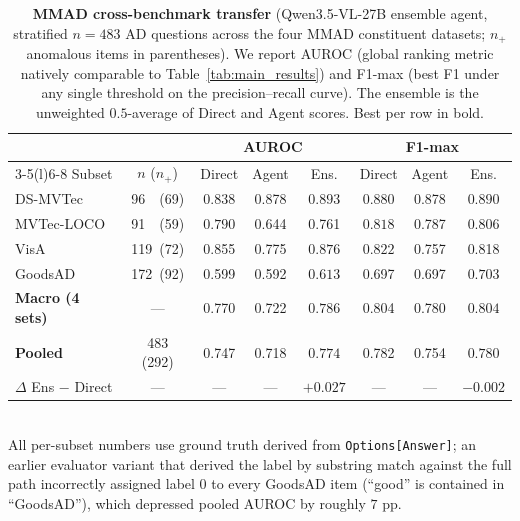 \begin{table}[h]
\centering
\caption{\textbf{MMAD cross-benchmark transfer} (Qwen3.5-VL-27B ensemble agent, stratified $n{=}483$ AD questions across the four MMAD constituent datasets; $n_+$ anomalous items in parentheses). We report AUROC (global ranking metric natively comparable to Table~\ref{tab:main_results}) and F1-max (best F1 under any single threshold on the precision--recall curve). The ensemble is the unweighted $0.5$-average of Direct and Agent scores. Best per row in bold.}
\label{tab:mmad}
\small
\begin{tabular}{lccccccc}
\toprule
 & & \multicolumn{3}{c}{AUROC} & \multicolumn{3}{c}{F1-max} \\
\cmidrule(lr){3-5}\cmidrule(l){6-8}
Subset  & $n$ ($n_+$) & Direct & Agent & Ens. & Direct & Agent & Ens. \\
\midrule
DS-MVTec    & 96\ \ (69) & 0.838 & 0.878 & $\mathbf{0.893}$ & $\mathbf{0.880}$ & 0.878 & $\mathbf{0.890}$ \\
MVTec-LOCO  & 91\ \ (59) & $\mathbf{0.790}$ & 0.644 & 0.761 & $\mathbf{0.818}$ & 0.787 & 0.806 \\
VisA        & 119\ (72) & 0.855 & 0.775 & $\mathbf{0.876}$ & $\mathbf{0.822}$ & 0.757 & 0.818 \\
GoodsAD     & 172\ (92) & 0.599 & 0.592 & $\mathbf{0.613}$ & 0.697 & 0.697 & $\mathbf{0.703}$ \\
\midrule
\textbf{Macro (4 sets)} &  --- & 0.770 & 0.722 & $\mathbf{0.786}$ & 0.804 & 0.780 & $\mathbf{0.804}$ \\
\textbf{Pooled}         & 483 (292) & 0.747 & 0.718 & $\mathbf{0.774}$ & 0.782 & 0.754 & $\mathbf{0.780}$ \\
$\Delta$ Ens $-$ Direct &  --- & --- & --- & $\mathbf{+0.027}$ & --- & --- & $-0.002$ \\
\bottomrule
\end{tabular}
\\[3pt]
{\footnotesize All per-subset numbers use ground truth derived from \texttt{Options[Answer]}; an earlier evaluator variant that derived the label by substring match against the full path incorrectly assigned label $0$ to every GoodsAD item (``good'' is contained in ``GoodsAD''), which depressed pooled AUROC by roughly $7$ pp.}
\end{table}

